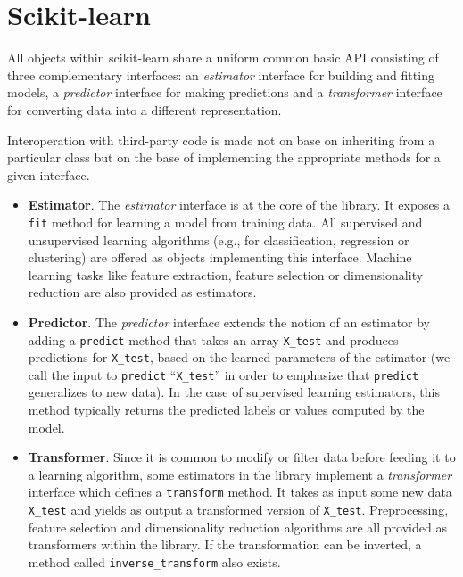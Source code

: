 \documentclass{frontiersSCNS} %
\begin{document}
\section{Scikit-learn}


All objects within scikit-learn share a uniform common basic API consisting of three
complementary interfaces: an \textit{estimator} interface for building and
fitting models, a \textit{predictor} interface for making predictions and a
\textit{transformer} interface for converting data into a different representation.

Interoperation with third-party code is made not on base on inheriting from a
particular class but on the base of implementing the appropriate methods for a
given interface.

\begin{itemize}
\item {\bf Estimator}. The \textit{estimator} interface is at the core of the library. It exposes a
    \texttt{fit} method for learning a model from training data.  All supervised
    and unsupervised learning algorithms (e.g., for classification, regression or
    clustering) are offered as objects implementing this interface. Machine
    learning tasks like feature extraction, feature selection or dimensionality
    reduction are also provided as estimators.

\item {\bf Predictor}. The \textit{predictor} interface extends the notion of an estimator
    by adding a \texttt{predict}
    method that takes an array \texttt{X\_test} and produces
    predictions for \texttt{X\_test}, based on the learned parameters of the
    estimator (we call the input to \texttt{predict} ``\texttt{X\_test}'' in order
    to emphasize that \texttt{predict} generalizes to new data). In the case of
    supervised learning estimators, this method typically returns the predicted
    labels or values computed by the model.

\item {\bf Transformer}. Since it is common to modify or filter data before feeding it to a learning
    algorithm, some estimators in the library implement a \textit{transformer}
    interface which defines a \texttt{transform} method. It takes as input some new
    data \texttt{X\_test} and yields as output a transformed version of
    \texttt{X\_test}. Preprocessing, feature selection and dimensionality reduction
    algorithms are all provided as transformers within the library. If the transformation
    can be inverted, a method called \verb!inverse_transform! also exists.

\end{itemize}
\end{document}
